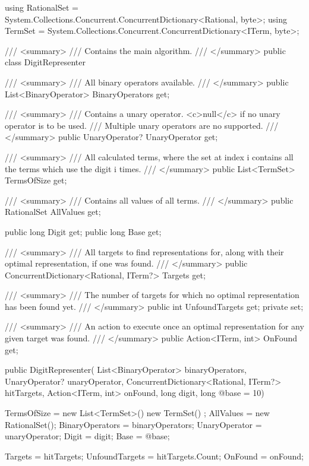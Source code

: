 \documentclass{article}
\theoremstyle{nonumberplain}
\begin{document}
\begin{lstcs}[]
using RationalSet = System.Collections.Concurrent.ConcurrentDictionary<Rational, byte>;
using TermSet = System.Collections.Concurrent.ConcurrentDictionary<ITerm, byte>;

/// <summary>
/// Contains the main algorithm.
/// </summary>
public class DigitRepresenter
{
    /// <summary>
    /// All binary operators available.
    /// </summary>
    public List<BinaryOperator> BinaryOperators { get; }

    /// <summary>
    /// Contains a unary operator. <c>null</c> if no unary operator is to be used.
    /// Multiple unary operators are no supported.
    /// </summary>
    public UnaryOperator? UnaryOperator { get; }

    /// <summary>
    /// All calculated terms, where the set at index i contains all the terms which use the digit i times.
    /// </summary>
    public List<TermSet> TermsOfSize { get; }

    /// <summary>
    /// Contains all values of all terms.
    /// </summary>
    public RationalSet AllValues { get; }

    public long Digit { get; }
    public long Base { get; }

    /// <summary>
    /// All targets to find representations for, along with their optimal representation, if one was found.
    /// </summary>
    public ConcurrentDictionary<Rational, ITerm?> Targets { get; }

    /// <summary>
    /// The number of targets for which no optimal representation has been found yet.
    /// </summary>
    public int UnfoundTargets { get; private set; }

    /// <summary>
    /// An action to execute once an optimal representation for any given target was found.
    /// </summary>
    public Action<ITerm, int> OnFound { get; }

    public DigitRepresenter(
        List<BinaryOperator> binaryOperators,
        UnaryOperator? unaryOperator,
        ConcurrentDictionary<Rational, ITerm?> hitTargets,
        Action<ITerm, int> onFound,
        long digit,
        long @base = 10)
    {
        TermsOfSize = new List<TermSet>() { new TermSet() };
        AllValues = new RationalSet();
        BinaryOperators = binaryOperators;
        UnaryOperator = unaryOperator;
        Digit = digit;
        Base = @base;

        Targets = hitTargets;
        UnfoundTargets = hitTargets.Count;
        OnFound = onFound;
    }

}
\end{lstcs}
\end{document}
